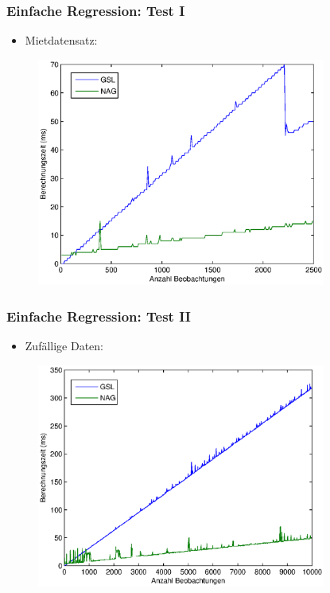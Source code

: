 \documentclass{beamer}
\begin{document}
\begin{frame}
  \frametitle{Einfache Regression: Test I} 
  
  \begin{itemize}
  \item Mietdatensatz:
  \end{itemize}

  \begin{figure}[t]
    \centering
    \includegraphics[width=9.5cm]{figures/simple_reg_comp_rent.eps}
  \end{figure}

\end{frame}

\begin{frame}
  \frametitle{Einfache Regression: Test II}

  \begin{itemize}
  \item Zufällige Daten:
  \end{itemize}
  
  \begin{figure}[t]
    \centering
    \includegraphics[width=9.5cm]{figures/simple_reg_comp.eps}
  \end{figure}

\end{frame}
\end{document}
